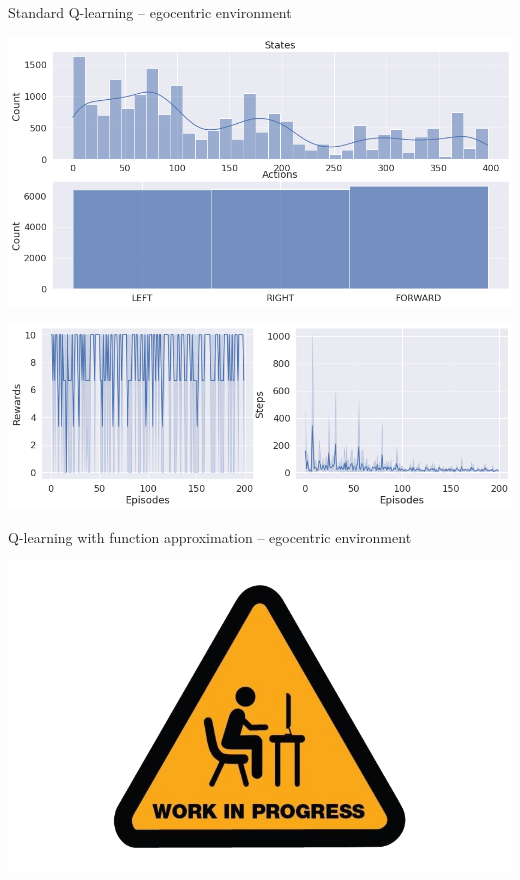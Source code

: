 \documentclass[bigger]{beamer}
\begin{document}
\begin{frame}[label={sec:orgb2d6106}]{Standard Q-learning -- egocentric environment}
\begin{center}
\includegraphics[height=0.4\textheight]{img/q-learning_ego_hist.png}
\end{center}
\begin{center}
\includegraphics[height=0.4\textheight]{img/q-learning_ego_steps_rewards.png}
\end{center}
\end{frame}
\begin{frame}[label={sec:orgaa35299}]{Q-learning with function approximation -- egocentric environment}
\begin{center}
\includegraphics[height=0.5\textheight]{img/work-in-progress.png}
\end{center}
\end{frame}
\end{document}
